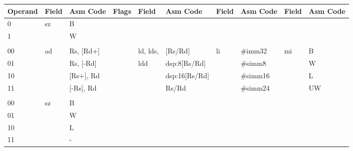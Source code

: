 \begin{table}
\vspace{0.5cm}

\begin{subtable}{\linewidth}
\begin{center}
\scriptsize
\begin{tabular}{l|lll|ll|ll|ll}
\hline
Operand         & Field   & Asm Code  & Flags                           & Field           & Asm Code      & Field & Asm Code & Field & Asm Code    \\ \hline
0               & sz      & B         &                                 &                 &               &       &          &       &             \\
1               &         & W         &                                 &                 &               &       &          &       &             \\
                &         &           &                                 &                 &               &       &          &       &             \\
00              & ad      & Rs, [Rd+] &                                 & ld, lds,        & [Rs/Rd]       & li    & \#imm32  & mi    & B           \\
01              &         & Rs, [-Rd] &                                 & ldd             & dsp:8[Rs/Rd]  &       & \#simm8  &       & W           \\
10              &         & [Rs+], Rd &                                 &                 & dsp:16[Rs/Rd] &       & \#simm16 &       & L           \\
11              &         & [-Rs], Rd &                                 &                 & Rs/Rd         &       & \#simm24 &       & UW          \\
                &         &           &                                 &                 &               &       &          &       &             \\
00              & sz      & B         &                                 &                 &               &       &          &       &             \\
01              &         & W         &                                 &                 &               &       &          &       &             \\
10              &         & L         &                                 &                 &               &       &          &       &             \\
11              &         & -         &                                 &                 &               &       &          &       &             \\

\end{tabular}
\end{center}
\end{subtable}
\end{table}
